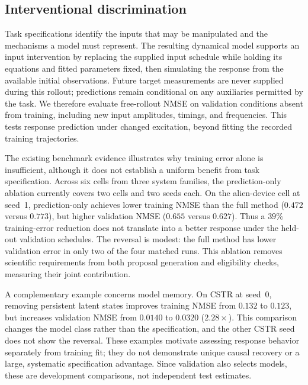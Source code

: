 \subsection{Interventional discrimination}
\label{sec:experiment_identifiability}

Task specifications identify the inputs that may be manipulated and the
mechanisms a model must represent. The resulting dynamical model supports an
input intervention by replacing the supplied input schedule while holding its
equations and fitted parameters fixed, then simulating the response from the
available initial observations. Future target measurements are never supplied
during this rollout; predictions remain conditional on any auxiliaries permitted
by the task. We therefore evaluate free-rollout NMSE on validation conditions
absent from training, including new input amplitudes, timings, and frequencies.
This tests response prediction under changed excitation, beyond fitting the
recorded training trajectories.

The existing benchmark evidence illustrates why training error alone is
insufficient, although it does not establish a uniform benefit from task
specification. Across six cells from three system families, the prediction-only
ablation currently covers two cells and two seeds each. On the alien-device
cell at seed~1, prediction-only achieves lower training NMSE than the full method
($0.472$ versus $0.773$), but higher validation NMSE ($0.655$ versus $0.627$).
Thus a $39\%$ training-error reduction does not translate into a better response
under the held-out validation schedules. The reversal is modest: the full method
has lower validation error in only two of the four matched runs. This ablation
removes scientific requirements from both proposal generation and eligibility
checks, measuring their joint contribution.

A complementary example concerns model memory. On CSTR at seed~0, removing
persistent latent states improves training NMSE from $0.132$ to $0.123$, but
increases validation NMSE from $0.0140$ to $0.0320$ ($2.28\times$). This comparison
changes the model class rather than the specification, and the other CSTR seed
does not show the reversal. These examples motivate assessing response behavior
separately from training fit; they do not demonstrate unique causal recovery or
a large, systematic specification advantage. Since validation also selects
models, these are development comparisons, not independent test estimates.
